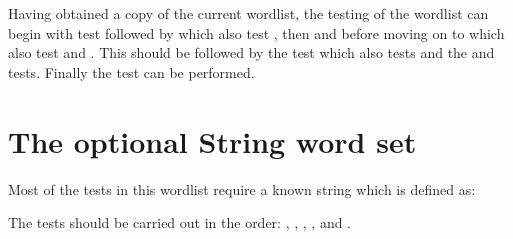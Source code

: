 Having obtained a copy of the current wordlist, the testing of the
wordlist can begin with test  followed
by  which also test , then
 and  before moving on to
 which also test  and
.  This should be followed by the test
 which also tests  and the
 and  tests.
Finally the  test can be performed.



\section{The optional String word set} %

Most of the tests in this wordlist require a known string which is
defined as:


The tests should be carried out in the order:
,
,
,
,
 and
.





\endinput %

\section{Test Harness} %

